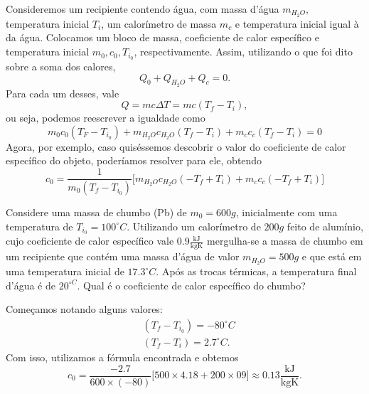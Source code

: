 \documentclass[phsyicsII_notes.tex]{subfiles}
\begin{document}
Consideremos um recipiente contendo água, com massa d'água \(m_{H_{2}O},\) temperatura inicial \(T_{i}\), um calorímetro
de massa \(m_{c}\) e temperatura inicial igual à da água. Colocamos um bloco de massa, coeficiente de calor específico e temperatura inicial \(m_{0}, c_{0}, T_{i_{0}}\),
respectivamente. Assim, utilizando o que foi dito sobre a soma dos calores,
\[
	Q_{0} + Q_{H_{2}O} + Q_{c} = 0.
\]
Para cada um desses, vale
\[
	Q = mc\Delta T = mc(T_{f}-T_{i}),
\]
ou seja, podemos reescrever a igualdade como
\[
	m_{0}c_{0}(T_{F} - T_{i_{0}}) + m_{H_{2}O}c_{H_{2}O}(T_{f}-T_{i}) + m_{c}c_{c}(T_{f}-T_{i}) = 0
\]
Agora, por exemplo, caso quiséssemos descobrir o valor do coeficiente de calor específico do objeto, poderíamos resolver para ele, obtendo
\[
	c_{0} = \frac{1}{m_{0}(T_{f}-T_{i_{0}})}\biggl[m_{H_{2}O}c_{H_{2}O}(-T_{f}+T_{i}) + m_{c}c_{c}(-T_{f}+T_{i})\biggr]
\]
\begin{example}
	Considere uma massa de chumbo (Pb) de \(m_{0} = 600g\), inicialmente com uma temperatura de \(T_{i_{0}} = 100^{\circ{}}C\). Utilizando um calorímetro de
	\(200g\) feito de alumínio, cujo coeficiente de calor específico vale \(0.9\frac{\text{kJ}}{\text{kgK}}\) mergulha-se a massa de chumbo em um recipiente que contém uma massa d'água de valor \(m_{H_{2}O}=500g\) e
	que está em uma temperatura inicial de \(17.3^{\circ{}}C.\) Após as trocas térmicas, a temperatura final d'água é de \(20^{\circ{}C}\). Qual é o coeficiente
	de calor específico do chumbo?

	Começamos notando alguns valores:
	\begin{align*}
		 & (T_{f}-T_{i_{0}}) = -80^{\circ{}}C \\
		 & (T_{f}-T_{i}) = 2.7^{\circ{}}C.
	\end{align*}
	Com isso, utilizamos a fórmula encontrada e obtemos
	\[
		c_{0} = \frac{-2.7}{600\times(-80)}\biggl[500\times 4.18 + 200\times 09\biggr]\approx 0.13 \frac{\text{kJ}}{\text{kgK}}.
	\]
\end{example}
\end{document}
